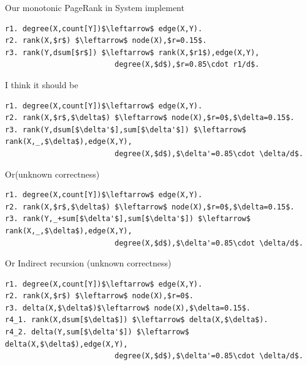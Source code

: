 \begin{appendix}
Our monotonic PageRank in System implement
\begin{lstlisting}
r1. degree(X,count[Y])$\leftarrow$ edge(X,Y).
r2. rank(X,$r$) $\leftarrow$ node(X),$r=0.15$.
r3. rank(Y,dsum[$r$]) $\leftarrow$ rank(X,$r1$),edge(X,Y),
                         degree(X,$d$),$r=0.85\cdot r1/d$.
\end{lstlisting}

I think it should be
\begin{lstlisting}
r1. degree(X,count[Y])$\leftarrow$ edge(X,Y).
r2. rank(X,$r$,$\delta$) $\leftarrow$ node(X),$r=0$,$\delta=0.15$.
r3. rank(Y,dsum[$\delta'$],sum[$\delta'$]) $\leftarrow$ rank(X,_,$\delta$),edge(X,Y),
                         degree(X,$d$),$\delta'=0.85\cdot \delta/d$.
\end{lstlisting}
Or(unknown correctness)
\begin{lstlisting}
r1. degree(X,count[Y])$\leftarrow$ edge(X,Y).
r2. rank(X,$r$,$\delta$) $\leftarrow$ node(X),$r=0$,$\delta=0.15$.
r3. rank(Y,_+sum[$\delta'$],sum[$\delta'$]) $\leftarrow$ rank(X,_,$\delta$),edge(X,Y),
                         degree(X,$d$),$\delta'=0.85\cdot \delta/d$.
\end{lstlisting}
Or Indirect recursion (unknown correctness)
\begin{lstlisting}
r1. degree(X,count[Y])$\leftarrow$ edge(X,Y).
r2. rank(X,$r$) $\leftarrow$ node(X),$r=0$.
r3. delta(X,$\delta$)$\leftarrow$ node(X),$\delta=0.15$.
r4_1. rank(X,dsum[$\delta$]) $\leftarrow$ delta(X,$\delta$).
r4_2. delta(Y,sum[$\delta'$]) $\leftarrow$ delta(X,$\delta$),edge(X,Y),
                         degree(X,$d$),$\delta'=0.85\cdot \delta/d$.
\end{lstlisting}


\end{appendix}
